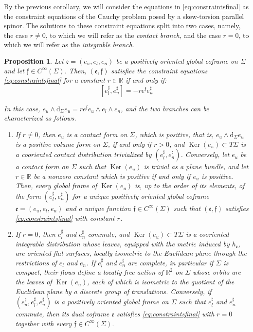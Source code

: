 \documentclass[10pt,reqno,a4paper]{amsart}
\theoremstyle{plain}
\newtheorem{prop}[thm]{Proposition}
\theoremstyle{definition}
\theoremstyle{remark}
\theoremstyle{remark}
\def\dd{\mathrm{d}}
\def\fre{\mathfrak{e}}
\newcommand{\Ker}{\operatorname{Ker}}
\renewcommand{\(}{ (}
\renewcommand{\)}{ )}
\newcommand{\frf}{\mathfrak{f}}
\begin{document}
\noindent
By the previous corollary, we will consider the equations in \eqref{eq:constraintsfinal} as the constraint equations of the Cauchy problem posed by a skew-torsion parallel spinor. The solutions to these constraint equations split into two cases, namely, the case $r\neq0$, to which we will refer as the \emph{contact branch}, and the case $r=0$, to which we will refer as the \emph{integrable branch}.

\begin{prop}
\label{prop:geometryconstraintbranches}
Let $\fre = (e_u,e_l,e_n)$ be a positively oriented global coframe on $\Sigma$ and let $\frf\in C^{\infty}(\Sigma)$. Then, $(\fre,\frf)$ satisfies the constraint equations \eqref{eq:constraintsfinal} for a constant $r\in \mathbb{R}$ if and only if:
\begin{equation}
\label{eq:bracketconstraint}
[e^{\sharp}_{l},e^{\sharp}_{n}]=-r e^{\frf}e^{\sharp}_{u}
\end{equation}

\noindent
In this case, $e_u\wedge \dd_{\Sigma} e_u = r e^{\frf} e_u\wedge e_l\wedge e_n$, and the two branches can be characterized as follows.
\begin{enumerate}
\item If $r\neq0$, then $e_u$ is a contact form on $\Sigma$, which is positive, that is, $e_u\wedge\dd_{\Sigma} e_u$ is a positive volume form on $\Sigma$, if and only if $r>0$, and $\Ker(e_u) \subset T\Sigma$ is a cooriented contact distribution trivialized by $(e^{\sharp}_{l},e^{\sharp}_{n})$. Conversely, let $e_u$ be a contact form on $\Sigma$ such that $\Ker(e_u)$ is trivial as a plane bundle, and let $r\in \mathbb{R}$ be a nonzero constant which is positive if and only if $e_u$ is positive. Then, every global frame of $\Ker(e_u)$ is, up to the order of its elements, of the form $(e^{\sharp}_{l},e^{\sharp}_{n})$ for a unique positively oriented global coframe $\fre = (e_u,e_l,e_n)$ and a unique function $\frf\in C^{\infty}(\Sigma)$ such that $(\fre,\frf)$ satisfies \eqref{eq:constraintsfinal} with constant $r$.

\item If $r=0$, then $e^{\sharp}_{l}$ and $e^{\sharp}_{n}$ commute, and $\Ker(e_u) \subset T\Sigma$ is a cooriented integrable distribution whose leaves, equipped with the metric induced by $h_{\fre}$, are oriented flat surfaces, locally isometric to the Euclidean plane through the restrictions of $e_l$ and $e_n$. If $e^{\sharp}_{l}$ and $e^{\sharp}_{n}$ are complete, in particular if $\Sigma$ is compact, their flows define a locally free action of $\mathbb{R}^2$ on $\Sigma$ whose orbits are the leaves of $\Ker(e_u)$, each of which is isometric to the quotient of the Euclidean plane by a discrete group of translations. Conversely, if $(e^{\sharp}_{u},e^{\sharp}_{l},e^{\sharp}_{n})$ is a positively oriented global frame on $\Sigma$ such that $e^{\sharp}_{l}$ and $e^{\sharp}_{n}$ commute, then its dual coframe $\fre$ satisfies \eqref{eq:constraintsfinal} with $r=0$ together with every $\frf \in C^{\infty}(\Sigma)$.
\end{enumerate}


\end{prop}
\end{document}
